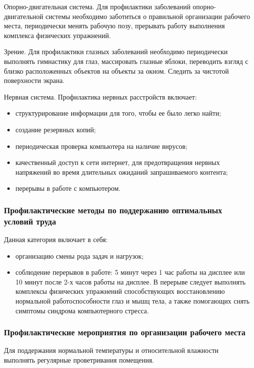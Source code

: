 Опорно-двигательная система. Для профилактики заболеваний опорно-двигательной системы необходимо заботиться о правильной организации рабочего места, периодически менять рабочую позу, прерывать работу выполнения комплекса физических упражнений.

Зрение. Для профилактики глазных заболеваний необходимо периодически выполнять гимнастику для глаз, массировать глазные яблоки, переводить взгляд с близко расположенных объектов на объекты за окном. Следить за чистотой поверхности экрана.

Нервная система. Профилактика нервных расстройств включает:
\begin{itemize}
\item структурирование информации для того, чтобы ее было легко найти;
\item создание резервных копий;
\item периодическая проверка компьютера на наличие вирусов;
\item качественный доступ к сети интернет,  для предотвращения нервных напряжений во время длительных ожиданий запрашиваемого контента;
\item перерывы в работе с компьютером.
\end{itemize}

\subsubsection{Профилактические методы по поддержанию оптимальных условий труда}
Данная категория включает в себя:
\begin{itemize}
\item организацию смены рода задач и нагрузок;
\item соблюдение  перерывов в работе: 5 минут через 1 час работы на дисплее или 10 минут после 2-х часов работы на дисплее. В перерыве следует выполнять комплексы физических упражнений способствующих восстановлению нормальной работоспособности глаз и мышц тела, а также помогающих снять симптомы синдрома компьютерного стресса.
\end{itemize}

\subsubsection{Профилактические мероприятия по организации рабочего места}
Для поддержания нормальной температуры и относительной влажности выполнять регулярные проветривания помещения.

